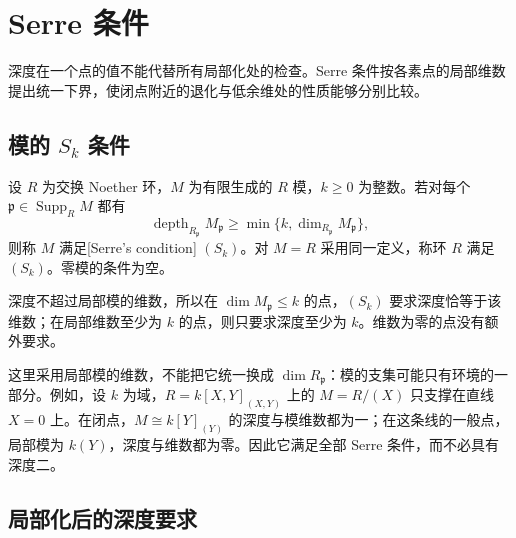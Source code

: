 
\section{Serre 条件}
\label{b3:sec:1604}

深度在一个点的值不能代替所有局部化处的检查。Serre 条件按各素点的局部维数提出统一下界，使闭点附近的退化与低余维处的性质能够分别比较。


%
%
%

\subsection{模的 \texorpdfstring{\(S_k\)}{Sk} 条件}
\label{b3:subsec:1604:01}

\begin{definition}\label{b3:def:serre-sk}
	设 \(R\) 为交换 Noether 环，\(M\) 为有限生成的 \(R\) 模，\(k\ge0\) 为整数。若对每个 \(\mathfrak p\in\operatorname{Supp}_RM\) 都有
	\[
		\operatorname{depth}_{R_{\mathfrak p}}M_{\mathfrak p} \ge\min\{k,\dim_{R_{\mathfrak p}}M_{\mathfrak p}\},
	\]
	则称 \(M\) 满足[Serre's condition] \((S_k)\)。对 \(M=R\) 采用同一定义，称环 \(R\) 满足 \((S_k)\)。零模的条件为空。
\end{definition}

深度不超过局部模的维数，所以在 \(\dim M_{\mathfrak p}\le k\) 的点，\((S_k)\) 要求深度恰等于该维数；在局部维数至少为 \(k\) 的点，则只要求深度至少为 \(k\)。维数为零的点没有额外要求。

这里采用局部模的维数，不能把它统一换成 \(\dim R_{\mathfrak p}\)：模的支集可能只有环境的一部分。例如，设 \(k\) 为域，\(R=k[X,Y]_{(X,Y)}\) 上的 \(M=R/(X)\) 只支撑在直线 \(X=0\) 上。在闭点，\(M\cong k[Y]_{(Y)}\) 的深度与模维数都为一；在这条线的一般点，局部模为 \(k(Y)\)，深度与维数都为零。因此它满足全部 Serre 条件，而不必具有深度二。

\subsection{局部化后的深度要求}
\label{b3:subsec:1604:02}

